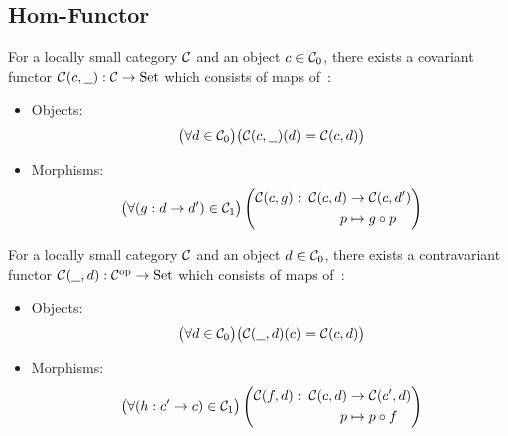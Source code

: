 \subsection{Hom-Functor}

\begin{definition}
  For a locally small category $\mathcal{C}$ and an object $c\in \mathcal{C}_0$, there exists a
  covariant functor $\mathcal{C}(c, \underline{\ \ }) : \mathcal{C} \to \mathrm{Set}$ which consists of maps
  of~\parencite{leinster:basic_category_theory}:
  \begin{itemize}
    \item Objects:
      \[\big(\forall d \in \mathcal{C}_0\big)
        \big(\mathcal{C}(c, \underline{\ \ })(d) = \mathcal{C}(c, d)\big)\]
    \item Morphisms:
      \[
        \begin{gathered}
          \big(\forall (g: d\to d')\in \mathcal{C}_1\big)
          \left(
            \begin{aligned}
              \mathcal{C}(c, g):&&\!\!\! \mathcal{C}(c, d) &\to \mathcal{C}(c, d')\\
              &&p &\mapsto g\circ p
            \end{aligned}
          \right)
        \end{gathered}
      \]
  \end{itemize}
\end{definition}

\begin{definition}
  For a locally small category $\mathcal{C}$ and an object $d\in \mathcal{C}_0$, there exists a
  contravariant functor $\mathcal{C}(\underline{\ \ }, d) : \mathcal{C}^{\mathrm{op}} \to \mathrm{Set}$ which consists
  of maps of~\parencite{leinster:basic_category_theory}:
  \begin{itemize}
    \item Objects:
      \[\big(\forall d \in \mathcal{C}_0\big)
        \big(\mathcal{C}(\underline{\ \ }, d)(c) = \mathcal{C}(c, d)\big)\]
    \item Morphisms:
      \[
        \begin{gathered}
          \big(\forall (h: c'\to c)\in \mathcal{C}_1\big)
          \left(
            \begin{aligned}
              \mathcal{C}(f, d):&&\!\!\! \mathcal{C}(c, d) &\to \mathcal{C}(c', d)\\
              &&p &\mapsto p\circ f
            \end{aligned}
          \right)
        \end{gathered}
      \]
  \end{itemize}
\end{definition}

